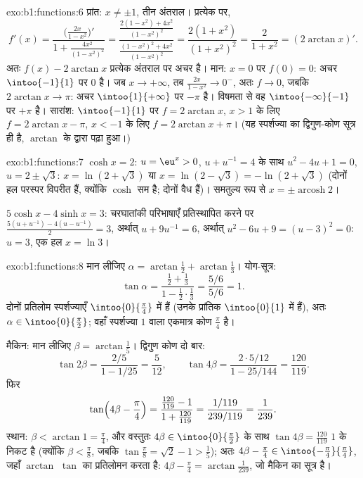 \begin{solution}{exo:b1:functions:6}
प्रांत: $x \neq \pm 1$, तीन अंतराल। प्रत्येक पर,
\[
f'(x) = \frac{\bigl(\frac{2x}{1-x^2}\bigr)'}{1 +
\frac{4x^2}{(1-x^2)^2}}
= \frac{\frac{2(1-x^2) + 4x^2}{(1-x^2)^2}}
{\frac{(1-x^2)^2 + 4x^2}{(1-x^2)^2}}
= \frac{2(1 + x^2)}{(1 + x^2)^2} = \frac{2}{1 + x^2}
= (2\arctan x)' .
\]
अतः $f(x) - 2\arctan x$ प्रत्येक अंतराल पर अचर है। मान: $x = 0$ पर $f(0) =
0$: अचर $\intoo{-1}{1}$ पर $0$ है। जब $x \to +\infty$, तब $\frac{2x}{1-x^2}
\to 0^-$, अतः $f \to 0$, जबकि $2\arctan x \to \pi$: अचर $\intoo{1}{+\infty}$
पर $-\pi$ है। विषमता से वह $\intoo{-\infty}{-1}$ पर $+\pi$ है। सारांश:
$\intoo{-1}{1}$ पर $f = 2\arctan x$, $x > 1$ के लिए $f = 2\arctan x - \pi$,
$x < -1$ के लिए $f = 2\arctan x + \pi$। (यह स्पर्शज्या का द्विगुण-कोण सूत्र
ही है, $\arctan$ के द्वारा पढ़ा हुआ।)
\end{solution}

\begin{solution}{exo:b1:functions:7}
$\cosh x = 2$: $u = \eu^x > 0$, $u + u^{-1} = 4$ के साथ $u^2 - 4u + 1 = 0$,
$u = 2 \pm \sqrt 3$: $x = \ln(2 + \sqrt 3)$ या $x = \ln(2 - \sqrt 3) =
-\ln(2 + \sqrt 3)$ (दोनों हल परस्पर विपरीत हैं, क्योंकि $\cosh$ सम है; दोनों
वैध हैं)। समतुल्य रूप से $x = \pm \operatorname{arcosh} 2$।

$5\cosh x - 4\sinh x = 3$: चरघातांकी परिभाषाएँ प्रतिस्थापित करने पर
$\frac{5(u + u^{-1}) - 4(u - u^{-1})}{2} = 3$, अर्थात् $u + 9u^{-1} = 6$,
अर्थात् $u^2 - 6u + 9 = (u - 3)^2 = 0$: $u = 3$, एक हल $x = \ln 3$।
\end{solution}

\begin{solution}{exo:b1:functions:8}
मान लीजिए $\alpha = \arctan\frac12 + \arctan\frac13$। योग-सूत्र:
\[
\tan\alpha = \frac{\frac12 + \frac13}{1 - \frac12\cdot\frac13}
= \frac{5/6}{5/6} = 1 .
\]
दोनों प्रतिलोम स्पर्शज्याएँ $\intoo{0}{\frac\pi4}$ में हैं (उनके प्रांतिक
$\intoo{0}{1}$ में हैं), अतः $\alpha \in \intoo{0}{\frac\pi2}$; वहाँ
स्पर्शज्या $1$ वाला एकमात्र कोण $\frac\pi4$ है।

मैकिन: मान लीजिए $\beta = \arctan\frac15$। द्विगुण कोण दो बार:
\[
\tan 2\beta = \frac{2/5}{1 - 1/25} = \frac{5}{12},
\qquad
\tan 4\beta = \frac{2 \cdot 5/12}{1 - 25/144} = \frac{120}{119}.
\]
फिर
\[
\tan\Bigl(4\beta - \frac\pi4\Bigr)
= \frac{\frac{120}{119} - 1}{1 + \frac{120}{119}}
= \frac{1/119}{239/119} = \frac{1}{239}.
\]
स्थान: $\beta < \arctan 1 = \frac\pi4$, और वस्तुतः $4\beta \in
\intoo{0}{\frac\pi2}$ के साथ $\tan 4\beta = \frac{120}{119}$ $1$ के निकट है
(क्योंकि $\beta < \frac\pi8$, जबकि $\tan\frac\pi8 = \sqrt 2 - 1 > \frac15$);
अतः $4\beta - \frac\pi4 \in \intoo{-\frac\pi4}{\frac\pi4}$, जहाँ $\arctan$
$\tan$ का प्रतिलोमन करता है: $4\beta - \frac\pi4 = \arctan\frac{1}{239}$, जो
मैकिन का सूत्र है।
\end{solution}


